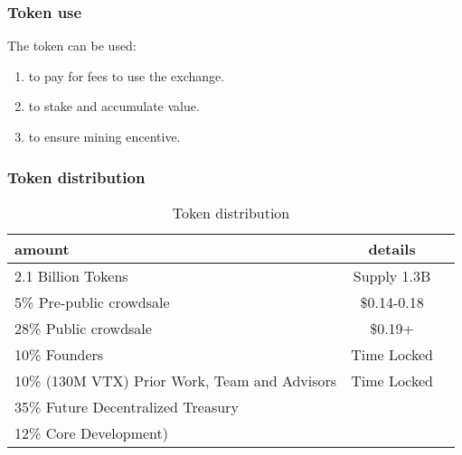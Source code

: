 \documentclass[]{article}
\begin{document}
\subsubsection{Token use}

The token can be used:
\begin{enumerate}
\item to pay for fees to use the exchange.
\item to stake and accumulate value.
\item to ensure mining encentive.
\end{enumerate}
 
\subsubsection{Token distribution}	
\begin{table}[h!]
	\begin{center}
		\caption{Token distribution}
		\label{tab:table1}
		\begin{tabular}{l|c|r}
			\textbf{amount} & \textbf{details} \\
			\hline
			2.1 Billion Tokens & Supply 1.3B \\
			\hline
			\hline
			5\%  Pre-public crowdsale & \$0.14-0.18 \\
			\hline
			28\% Public crowdsale & \$0.19+ \\
			\hline
			10\% Founders & Time Locked\\
			\hline
			10\% (130M VTX) Prior Work, Team and Advisors & Time Locked\\
			\hline
			35\% Future Decentralized Treasury\\
			\hline
			12\% Core Development)\\
			\hline			
		
			
		\end{tabular}
	\end{center}
\end{table}
\end{document}
